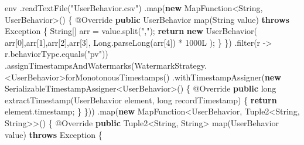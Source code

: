 \documentclass[cn,11pt,chinese]{elegantbook}
\newenvironment{Shaded}{}{}
\newcommand{\AttributeTok}[1]{\textcolor[rgb]{0.49,0.56,0.16}{#1}}
\newcommand{\BuiltInTok}[1]{#1}
\newcommand{\DataTypeTok}[1]{\textcolor[rgb]{0.56,0.13,0.00}{#1}}
\newcommand{\DecValTok}[1]{\textcolor[rgb]{0.25,0.63,0.44}{#1}}
\newcommand{\FunctionTok}[1]{\textcolor[rgb]{0.02,0.16,0.49}{#1}}
\newcommand{\KeywordTok}[1]{\textcolor[rgb]{0.00,0.44,0.13}{\textbf{#1}}}
\newcommand{\NormalTok}[1]{#1}
\newcommand{\StringTok}[1]{\textcolor[rgb]{0.25,0.44,0.63}{#1}}
\begin{document}
\begin{Shaded}
\begin{Highlighting}[]
\NormalTok{        env}
\NormalTok{            .}\FunctionTok{readTextFile}\NormalTok{(}\StringTok{"UserBehavior.csv"}\NormalTok{)}
\NormalTok{            .}\FunctionTok{map}\NormalTok{(}\KeywordTok{new}\NormalTok{ MapFunction\textless{}}\BuiltInTok{String}\NormalTok{, UserBehavior\textgreater{}() \{}
                \AttributeTok{@Override}
                \KeywordTok{public}\NormalTok{ UserBehavior }\FunctionTok{map}\NormalTok{(}\BuiltInTok{String}\NormalTok{ value) }\KeywordTok{throws} \BuiltInTok{Exception}\NormalTok{ \{}
                    \BuiltInTok{String}\NormalTok{[] arr = value.}\FunctionTok{split}\NormalTok{(}\StringTok{","}\NormalTok{);}
                    \KeywordTok{return} \KeywordTok{new} \FunctionTok{UserBehavior}\NormalTok{(}
\NormalTok{                            arr[}\DecValTok{0}\NormalTok{],arr[}\DecValTok{1}\NormalTok{],arr[}\DecValTok{2}\NormalTok{],arr[}\DecValTok{3}\NormalTok{],}
                            \BuiltInTok{Long}\NormalTok{.}\FunctionTok{parseLong}\NormalTok{(arr[}\DecValTok{4}\NormalTok{]) * }\DecValTok{1000L}
\NormalTok{                    );}
\NormalTok{                \}}
\NormalTok{            \})}
\NormalTok{            .}\FunctionTok{filter}\NormalTok{(r {-}\textgreater{} r.}\FunctionTok{behaviorType}\NormalTok{.}\FunctionTok{equals}\NormalTok{(}\StringTok{"pv"}\NormalTok{))}
\NormalTok{            .}\FunctionTok{assignTimestampsAndWatermarks}\NormalTok{(WatermarkStrategy.\textless{}UserBehavior\textgreater{}}\FunctionTok{forMonotonousTimestamps}\NormalTok{()}
\NormalTok{            .}\FunctionTok{withTimestampAssigner}\NormalTok{(}\KeywordTok{new}\NormalTok{ SerializableTimestampAssigner\textless{}UserBehavior\textgreater{}() \{}
                \AttributeTok{@Override}
                \KeywordTok{public} \DataTypeTok{long} \FunctionTok{extractTimestamp}\NormalTok{(UserBehavior element, }\DataTypeTok{long}\NormalTok{ recordTimestamp) \{}
                    \KeywordTok{return}\NormalTok{ element.}\FunctionTok{timestamp}\NormalTok{;}
\NormalTok{                \}}
\NormalTok{            \}))}
\NormalTok{            .}\FunctionTok{map}\NormalTok{(}\KeywordTok{new}\NormalTok{ MapFunction\textless{}UserBehavior, Tuple2\textless{}}\BuiltInTok{String}\NormalTok{, }\BuiltInTok{String}\NormalTok{\textgreater{}\textgreater{}() \{}
                \AttributeTok{@Override}
                \KeywordTok{public}\NormalTok{ Tuple2\textless{}}\BuiltInTok{String}\NormalTok{, }\BuiltInTok{String}\NormalTok{\textgreater{} }\FunctionTok{map}\NormalTok{(UserBehavior value) }\KeywordTok{throws} \BuiltInTok{Exception}\NormalTok{ \{}

\end{Highlighting}
\end{Shaded}
\end{document}
